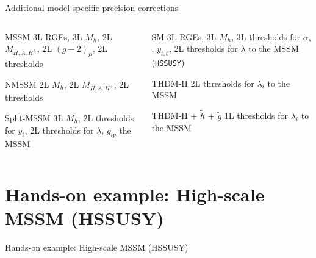 \documentclass[hyperref={pdfpagelabels=false},ngerman]{beamer}
\newcommand{\as}{\alpha_s}
\begin{document}
\begin{frame}{Additional model-specific precision corrections}
  \begin{columns}[T]
    \begin{column}{0.49\textwidth}
      \begin{modelblock}{MSSM}
        3L RGEs, 3L $M_h$, 2L $M_{H,A,H^\pm}$, 2L $(g-2)_\mu$, 2L
        thresholds
      \end{modelblock}
      \begin{modelblock}{NMSSM}
        2L $M_h$, 2L $M_{H,A,H^\pm}$, 2L thresholds
      \end{modelblock}
      \begin{modelblock}{Split-MSSM}
        3L $M_h$, 2L thresholds for $y_t$, 2L thresholds for $\lambda$, $\tilde{g}_{ip}$
        the MSSM
      \end{modelblock}
    \end{column}
    \begin{column}{0.49\textwidth}
      \begin{modelblock}{SM}
        3L RGEs, 3L $M_h$, 3L thresholds for $\as$, $y_{t,b}$, 2L
        thresholds for $\lambda$ to the MSSM (\texttt{HSSUSY})
      \end{modelblock}
      \begin{modelblock}{THDM-II}
        2L thresholds for $\lambda_i$ to the MSSM
      \end{modelblock}
      \begin{modelblock}{THDM-II + $\tilde{h}$ + $\tilde{g}$}
        1L thresholds for $\lambda_i$ to the MSSM
      \end{modelblock}
    \end{column}
  \end{columns}
\end{frame}

\section{Hands-on example: High-scale MSSM (HSSUSY)}

\begin{frame}{Hands-on example: High-scale MSSM (HSSUSY)}
  \begin{center}
  \end{center}
\end{frame}
\end{document}
